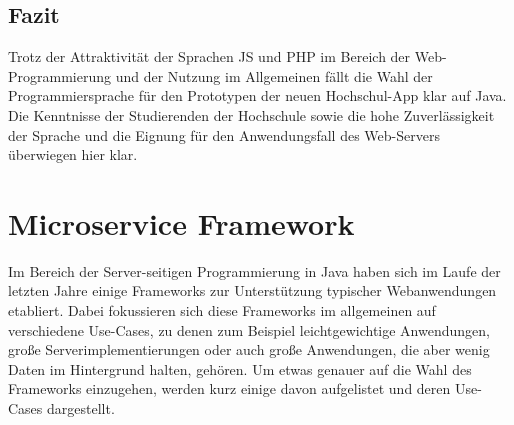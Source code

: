\subsection*{Fazit}

Trotz der Attraktivität der Sprachen \ac{JS} und \ac{PHP} im Bereich der Web-Program\-mierung und der Nutzung im Allgemeinen fällt die Wahl der Programmiersprache für den Prototypen der neuen Hochschul-\ac{App} klar auf Java. Die Kenntnisse der Studierenden der Hochschule sowie die hohe Zuverlässigkeit der Sprache und die Eignung für den Anwendungsfall des Web-Servers überwiegen hier klar.

\section{Microservice Framework}
\label{sec:framework}

Im Bereich der Server-seitigen Programmierung in Java haben sich im Laufe der letzten Jahre einige Frameworks zur Unterstützung typischer Webanwendungen etabliert. Dabei fokussieren sich diese Frameworks im allgemeinen auf verschiedene Use-Cases, zu denen zum Beispiel leichtgewichtige Anwendungen, große Serverimplementierungen oder auch große Anwendungen, die aber wenig Daten im Hintergrund halten, gehören. Um etwas genauer auf die Wahl des Frameworks einzugehen, werden kurz einige davon aufgelistet und deren Use-Cases dargestellt.\\

